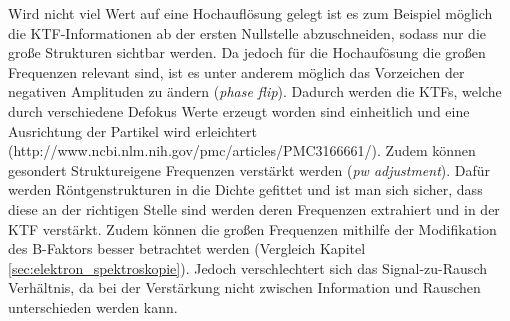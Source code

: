 Wird nicht viel Wert auf eine Hochauflösung gelegt ist es zum Beispiel möglich die KTF-Informationen ab der ersten Nullstelle abzuschneiden, sodass nur die große Strukturen sichtbar werden.
Da jedoch für die Hochaufösung die großen Frequenzen relevant sind, ist es unter anderem möglich das Vorzeichen der negativen Amplituden zu ändern (\textit{phase flip}).
Dadurch werden die KTFs, welche durch verschiedene Defokus Werte erzeugt worden sind einheitlich und eine Ausrichtung der Partikel wird erleichtert (http://www.ncbi.nlm.nih.gov/pmc/articles/PMC3166661/).
Zudem können gesondert Struktureigene Frequenzen verstärkt werden (\textit{pw adjustment}).
Dafür werden Röntgenstrukturen in die Dichte gefittet und ist man sich sicher, dass diese an der richtigen Stelle sind werden deren Frequenzen extrahiert und in der KTF verstärkt.
Zudem können die großen Frequenzen mithilfe der Modifikation des B-Faktors besser betrachtet werden (Vergleich Kapitel \ref{sec:elektron_spektroskopie}). 
Jedoch verschlechtert sich das Signal-zu-Rausch Verhältnis, da bei der Verstärkung nicht zwischen Information und Rauschen unterschieden werden kann.

\FloatBarrier